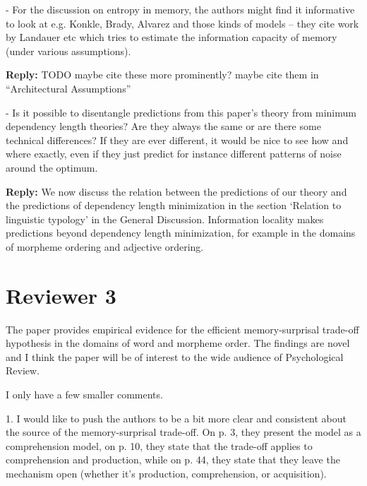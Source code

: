 \documentclass{article}[11pt,a4paper,oneside]
\newcommand\mhahn[1]{\textcolor{red}{[mhahn: #1]}}
\newenvironment{reply}
  {\par\medskip
   \color{blue}%
   \begin{framed}
   \textbf{Reply: }\ignorespaces}
 {\end{framed}
  \medskip}
\begin{document}
- For the discussion on entropy in memory, the authors might find it informative to look at e.g. Konkle, Brady, Alvarez and those kinds of models -- they cite work by Landauer etc which tries to estimate the information capacity of memory (under various assumptions).

\begin{reply}
	TODO maybe cite these more prominently? maybe cite them in ``Architectural Assumptions''
\end{reply}

- Is it possible to disentangle predictions from this paper's theory from minimum dependency length theories? Are they always the same or are there some technical differences? If they are ever different, it would be nice to see how and where exactly, even if they just predict for instance different patterns of noise around the optimum.


\begin{reply}
    We now discuss the relation between the predictions of our theory and the predictions of dependency length minimization in the section `Relation to linguistic typology' in the General Discussion. Information locality makes predictions beyond dependency length minimization, for example in the domains of morpheme ordering and adjective ordering.
\end{reply}



\section{Reviewer 3}

The paper provides empirical evidence for the efficient memory-surprisal trade-off hypothesis in the domains of word and morpheme order. The findings are novel and I think the paper will be of interest to the wide audience of Psychological Review.

I only have a few smaller comments.

1. I would like to push the authors to be a bit more clear and consistent about the source of the memory-surprisal trade-off. On p. 3, they present the model as a comprehension model, on p. 10, they state that the trade-off applies to comprehension and production, while on p. 44, they state that they leave the mechanism open (whether it's production, comprehension, or acquisition).
\end{document}
